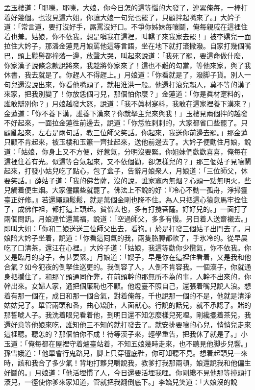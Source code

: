 {}孟玉樓道：「耶嚛，耶嚛，大娘，你今日怎的這等惱的大發了，連累俺每，一棒打着好幾個。也沒見這六姐，你讓大娘一句兒也罷了，只顧拌起嘴來了。」大妗子道：「常言道，要打沒好手，厮罵沒好口。不爭你姊妹每嚷鬬，俺每親戚在這裡住着也羞。姑娘，你不依我，想是嗔我在這裡，叫轎子來我家去罷！」被李嬌兒一面拉住大妗子，那潘金蓮見月娘罵他這等言語，坐在地下就打滾撒潑。{}自家打幾個嘴巴，{}頭上鬏髻都撞落一邊，放聲大哭，叫起來說道：「我死了罷，要這命做什麼，你家漢子說條念款說將來，我趁將你家來了！這也不難的勾當，等他來家，與了我休書，我去就是了。你趕人不得趕上。」月娘道：「你看就是了，潑脚子貨。別人一句兒還沒說出來，你看他嘴頭子，就相淮洪一般。他還打滾兒賴人，莫不等的漢子來家，把我別變了！你放恁個刁兒，那個怕你麼？」金蓮道：「你是眞材寔料的，誰敢辯別你？」月娘越發大怒，說道：「我不眞材寔料，我敢在這家裡養下漢來？」{}金蓮道：「你不養下漢，誰養下漢來？你就拏主兒來與我！」{}玉樓見兩個拌的越發不好起來，一面拉金蓮徃前邊去，說道：「你恁恠剌剌的，大家都省口些罷了。只顧亂起來，左右是兩句話，教三位師父笑話。你起來，我送你前邊去罷。」那金蓮只顧不肯起來，被玉樓和玉簫一齊扯起來，送他前邊去了。大妗子便勸住月娘，說道：「姑娘，你身上又不方便，好惹氣，分明沒要緊。你姐妹們歡歡喜喜，俺每在這裡住着有光。似這等合氣起來，又不依個勸，卻怎樣兒的？」那三個姑子見嚷鬧起來，打發小姑兒吃了點心，包了盒子，告辭月娘衆人，月娘道：「三位師父，休要笑話。」薛姑子道：「我的佛菩薩，沒的說，誰家竈內無烟？心頭一點無明火，些兒觸着便生烟。大家儘讓些就罷了。{}佛法上不說的好：『冷心不動一孤舟，淨掃靈臺正好修。』若還繩頭鬆鬆，就是萬個金剛也降不住。為人只把這心猿意馬牢拴住了，成佛作祖，都打這上頭起。{}貧僧去也，多有打攪菩薩。好好兒的。」一面打了兩個問訊。月娘連忙還萬福，說道：「空過師父，多多有慢。另日着人送齋襯去。」即叫大姐：「你和二娘送送三位師父出去，看狗。」於是打發三個姑子出門去了。月娘陪大妗子坐着，說道：「你看這囘氣的我，兩隻胳膊都軟了，手氷冷的。從早晨吃了口清茶，還汪在心裡。」大妗子道：「姑娘，我這等勸你少攬氣，你不依我。你又是臨月的身子，有甚要緊。」月娘道：「嫂子，早是你在這裡住看着，又是我和他合氣？如今犯夜的倒拏住巡更的。我倒容了人，人倒不肯容我。{}一個漢子，你就通身把攔住了，和那丫頭通同作弊，在前頭幹的那無所不為的事，人幹不出來的，你幹出來。女婦人家，通把個廉恥也不顧。他燈臺不照自己，還張着嘴兒說人浪。想着有那一個在，成日和那一個合氣，對着俺每，千也說那一個的不是，他就是清淨姑姑兒了。單管兩頭和番，曲心矯肚，人面獸心。行說的話兒，就不承認了。賭的那誓唬人子。我洗着眼兒看着他，到明日還不知怎麼樣兒死哩。剛纔擺着茶兒，我還好意等他娘來吃，誰知他三不知的就打發去了。就安排要嚷的心兒，悄悄兒走來這裡聽。聽怎的？那個怕你不成！待等漢子來，輕學重告，把我休了就是了。」小玉道：「俺每都在屋裡守着爐臺站着，不知五娘幾時走來，也不聽見他脚步兒響。」孫雪娥道：「他單會行鬼路兒，脚上只穿氊底鞋，你可知聽不見。想着起頭兒一來時，該和我合了多少氣！背地打夥兒嚼說我，教爹打我那兩頓，娘還說我和他偏生好鬬的。」{}月娘道：「他活埋慣了人，今日還要活埋我哩。你剛纔不見他那等撞頭打滾兒，一徑使你爹來家知道，管就把我翻倒底下。」李嬌兒笑道：「大娘沒的說